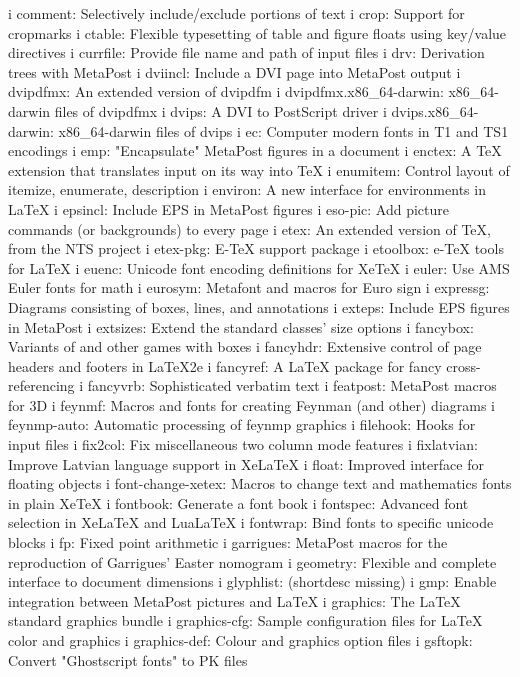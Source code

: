 i comment: Selectively include/exclude portions of text
i crop: Support for cropmarks
i ctable: Flexible typesetting of table and figure floats using key/value directives
i currfile: Provide file name and path of input files
i drv: Derivation trees with MetaPost
i dviincl: Include a DVI page into MetaPost output
i dvipdfmx: An extended version of dvipdfm
i dvipdfmx.x86_64-darwin: x86_64-darwin files of dvipdfmx
i dvips: A DVI to PostScript driver
i dvips.x86_64-darwin: x86_64-darwin files of dvips
i ec: Computer modern fonts in T1 and TS1 encodings
i emp: "Encapsulate" MetaPost figures in a document
i enctex: A TeX extension that translates input on its way into TeX
i enumitem: Control layout of itemize, enumerate, description
i environ: A new interface for environments in LaTeX
i epsincl: Include EPS in MetaPost figures
i eso-pic: Add picture commands (or backgrounds) to every page
i etex: An extended version of TeX, from the NTS project
i etex-pkg: E-TeX support package
i etoolbox: e-TeX tools for LaTeX
i euenc: Unicode font encoding definitions for XeTeX
i euler: Use AMS Euler fonts for math
i eurosym: Metafont and macros for Euro sign
i expressg: Diagrams consisting of boxes, lines, and annotations
i exteps: Include EPS figures in MetaPost
i extsizes: Extend the standard classes' size options
i fancybox: Variants of \fbox and other games with boxes
i fancyhdr: Extensive control of page headers and footers in LaTeX2e
i fancyref: A LaTeX package for fancy cross-referencing
i fancyvrb: Sophisticated verbatim text
i featpost: MetaPost macros for 3D
i feynmf: Macros and fonts for creating Feynman (and other) diagrams
i feynmp-auto: Automatic processing of feynmp graphics
i filehook: Hooks for input files
i fix2col: Fix miscellaneous two column mode features
i fixlatvian: Improve Latvian language support in XeLaTeX
i float: Improved interface for floating objects
i font-change-xetex: Macros to change text and mathematics fonts in plain XeTeX
i fontbook: Generate a font book
i fontspec: Advanced font selection in XeLaTeX and LuaLaTeX
i fontwrap: Bind fonts to specific unicode blocks
i fp: Fixed point arithmetic
i garrigues: MetaPost macros for the reproduction of Garrigues' Easter nomogram
i geometry: Flexible and complete interface to document dimensions
i glyphlist: (shortdesc missing)
i gmp: Enable integration between MetaPost pictures and LaTeX
i graphics: The LaTeX standard graphics bundle
i graphics-cfg: Sample configuration files for LaTeX color and graphics
i graphics-def: Colour and graphics option files
i gsftopk: Convert "Ghostscript fonts" to PK files
